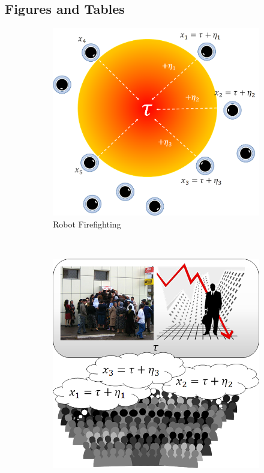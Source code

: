 \documentclass[12pt]{article}
\begin{document}
\subsection*{Figures and Tables}
\begin{figure}[ht!]
    \centering\begin{subfigure}[t]{0.41\textwidth}
        \centering
        \includegraphics[width=1\textwidth]{figures/firefighting.png}
        \caption{Robot Firefighting}
    \end{subfigure}%
    ~ 
    \begin{subfigure}[t]{0.41\textwidth}
        \centering
        \includegraphics[width=1\textwidth]{figures/bankrun.png}

\end{subfigure}
\end{figure}
\end{document}
